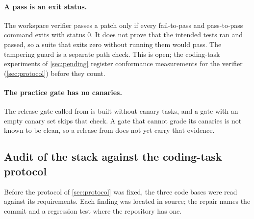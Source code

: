 \paragraph{A pass is an exit status.} The workspace verifier passes a patch only if every
fail-to-pass and pass-to-pass command exits with status 0. It does not prove that
the intended tests ran and passed, so a suite that exits zero without running them would
pass. The tampering guard is a separate path check. This is open; the coding-task
experiments of \cref{sec:pending} register conformance measurements for the verifier
(\cref{sec:protocol}) before they count.

\paragraph{The practice gate has no canaries.} The release gate called from 
is built without canary tasks, and a gate with an empty canary set skips that check.
A gate that cannot grade its canaries is not known to be clean, so a release from
 does not yet carry that evidence.

\subsection{Audit of the stack against the coding-task protocol}\label{sec:audit}

Before the protocol of \cref{sec:protocol} was fixed, the three code bases were read against
its requirements. Each finding was located in source; the repair names the commit and a
regression test where the repository has one.

